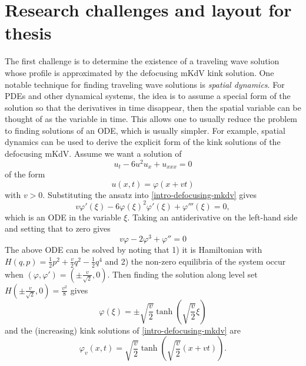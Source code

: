 \section{Research challenges and layout for thesis}

The first challenge is to determine the existence of a traveling wave solution whose profile is approximated by the defocusing mKdV kink solution. One notable technique for finding traveling wave solutions is \emph{spatial dynamics}. For PDEs and other dynamical systems, the idea is to assume a special form of the solution so that the derivatives in time disappear, then the spatial variable can be thought of as the variable in time. This allows one to usually reduce the problem to finding solutions of an ODE, which is usually simpler. For example, spatial dynamics can be used to derive the explicit form of the kink solutions of the defocusing mKdV. Assume we want a solution of 
\begin{equation}\label{intro-defocusing-mkdv}
	u_t - 6u^2u_x + u_{xxx} = 0
\end{equation}
of the form
\begin{equation}
	u(x,t) = \varphi(x+vt) 
\end{equation}
with \(v > 0\). Substituting the ansatz into \cref{intro-defocusing-mkdv} gives
\begin{equation}
	v \varphi '(\xi) - 6\varphi(\xi)^2 \varphi'(\xi) + \varphi'''(\xi) = 0,
\end{equation}
which is an ODE in the variable \(\xi\). Taking an antiderivative on the left-hand side and setting that to zero gives
\begin{equation}
	v\varphi  - 2 \varphi^3  + \varphi'' = 0
\end{equation}
The above ODE can be solved by noting that 1) it is Hamiltonian with \(H(q,p) = \frac 1 2 p^2 + \frac v 2 q^2 - \frac 12 q^4\) and 2) the non-zero equilibria of the system occur when \((\varphi, \varphi') = (\pm \frac v {\sqrt 2}, 0)\). Then finding the solution along level set \(H(\pm \frac v {\sqrt 2}, 0) = \frac {v^2} 8\) gives 
\begin{equation}
	\varphi(\xi) = \pm \sqrt{\frac v  2} \tanh\left( \sqrt{\frac v 2} \xi\right)
\end{equation}
and the (increasing) kink solutions of \cref{intro-defocusing-mkdv} are
\begin{equation}
	\varphi_v(x,t) = \sqrt{\frac v 2} \tanh\left(\sqrt{\frac v 2} (x+vt) \right).
\end{equation}

